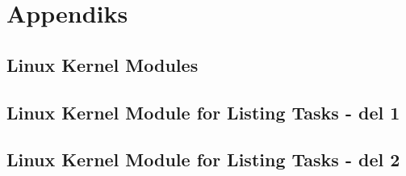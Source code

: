 \documentclass[main.tex]{subfile}
\begin{document}
\appendix
\section{Appendiks}
\subsection{Linux Kernel Modules}
\label{sec:simple.c}
\pagebreak

\subsection{Linux Kernel Module for Listing Tasks - del 1}
\label{sec:taskPrinter}
\pagebreak

\subsection{Linux Kernel Module for Listing Tasks - del 2}
\label{sec:taskAndChildPrinter}
\pagebreak
\end{document}
